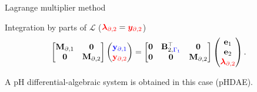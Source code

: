 \documentclass[aspectratio=169]{ISAE-Beamer}
\begin{document}
\begin{frame}{Lagrange multiplier method}
{\begin{exampleblock}{Integration by parts of $\mathcal{L}$ ($\textcolor{red}{\bm{\lambda}_{\partial, 2}} = \textcolor{red}{\bm{y}_{\partial, 2}}$)}
\begin{equation*}
\begin{aligned}
					\begin{bmatrix}
						\mathbf{M}_{\partial, 1} & \mathbf{0} \\
						\mathbf{0} & \mathbf{M}_{\partial, 2} \\
					\end{bmatrix}
					\begin{pmatrix}
						\textcolor{blue}{\mathbf{y}_{\partial, 1}} \\
						\textcolor{red}{\mathbf{y}_{\partial, 2}} \\
					\end{pmatrix}
					&= \begin{bmatrix}
						\mathbf{0} & \mathbf{B}_{2, \textcolor{blue}{\Gamma_1}}^\top & \mathbf{0} \\
						\mathbf{0} & \mathbf{0} & \mathbf{M}_{\partial, 2} \\
					\end{bmatrix}\begin{pmatrix}
						\mathbf{e}_{1} \\
						\mathbf{e}_{2} \\
						\textcolor{red}{\bm{\lambda}_{\partial, 2}} \\
					\end{pmatrix}.
				\end{aligned}
			\end{equation*}
		\end{exampleblock}
	}
	A pH differential-algebraic system is obtained in this case (pHDAE).
\end{frame}
\end{document}
